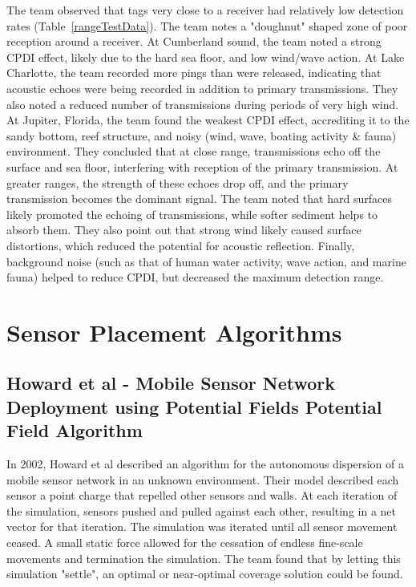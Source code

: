 The team observed that tags very close to a receiver had relatively low detection rates (Table~\ref{rangeTestData}).  The team notes a "doughnut" shaped zone of poor reception around a receiver.  At Cumberland sound, the team noted a strong CPDI effect, likely due to the hard sea floor, and low wind/wave action.  At Lake Charlotte, the team recorded more pings than were released, indicating that acoustic echoes were being recorded in addition to primary transmissions.   They also noted a reduced number of transmissions during periods of very high wind.  At Jupiter, Florida, the team found the weakest CPDI effect, accrediting it to the sandy bottom, reef structure, and noisy (wind, wave, boating activity \& fauna) environment.  They concluded that at close range, transmissions echo off the surface and sea floor, interfering with reception of the primary transmission.  At greater ranges, the strength of these echoes drop off, and the primary transmission becomes the dominant signal.  The team noted that hard surfaces likely promoted the echoing of transmissions, while softer sediment helps to absorb them.  They also point out that strong wind likely caused surface distortions, which reduced the potential for acoustic reflection.  Finally, background noise (such as that of human water activity, wave action, and marine fauna) helped to reduce CPDI, but decreased the maximum detection range.


\section{Sensor Placement Algorithms}
\subsection{Howard et al - Mobile Sensor Network Deployment using Potential Fields Potential Field Algorithm}
In 2002, Howard et al described an algorithm for the autonomous dispersion of a mobile sensor network in an unknown environment.  Their model described each sensor a point charge that repelled other sensors and walls.  At each iteration of the simulation, sensors pushed and pulled against each other, resulting in a net vector for that iteration.  The simulation was iterated until all sensor movement ceased.  A small static force allowed for the cessation of endless fine-scale movements and termination the simulation.  The team found that by letting this simulation "settle", an optimal or near-optimal coverage solution could be found.  


